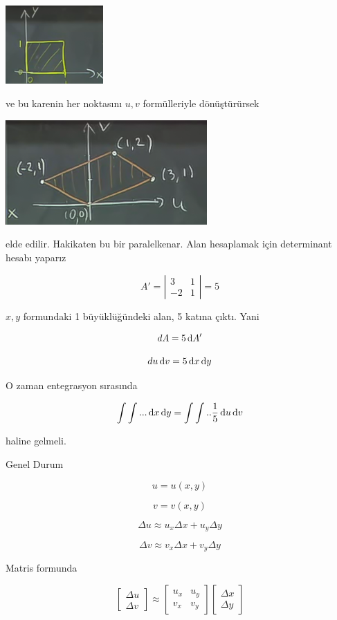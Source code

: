 \documentclass[12pt,fleqn]{article}\usepackage{../../common}
\begin{document}
\begin{center}
\includegraphics[height=3cm]{18_4.png}
\end{center}

ve bu karenin her noktasını $u,v$ formülleriyle dönüştürürsek

\begin{center}
\includegraphics[height=4cm]{18_5.png}
\end{center}

elde edilir. Hakikaten bu bir paralelkenar. Alan hesaplamak için
determinant hesabı yaparız

$$ A' = 
\left|\begin{array}{rr}
3 & 1 \\
-2 & 1
\end{array}\right| = 5
 $$

$x,y$ formundaki 1 büyüklüğündeki alan, 5 katına çıktı. Yani 

$$ dA = 5 \,\mathrm{d} A' $$

$$ du \,\mathrm{d} v = 5 \,\mathrm{d} x \,\mathrm{d} y $$

O zaman entegrasyon sırasında 

$$ \int \int ... \,\mathrm{d} x \,\mathrm{d} y = \int \int ..  \frac{1}{5} \,\mathrm{d} u \,\mathrm{d} v $$

haline gelmeli. 

Genel Durum 

$$ u = u(x,y) $$

$$ v = v(x,y)  $$

$$ \Delta u \approx u_x \Delta x + u_y \Delta y  $$

$$ \Delta v \approx v_x \Delta x + v_y \Delta y  $$

Matris formunda 

$$ 
\left[\begin{array}{r}
\Delta u \\
\Delta v 
\end{array}\right] \approx 
\left[\begin{array}{rr}
u_x & u_y \\
v_x & v_y
\end{array}\right] 
\left[\begin{array}{r}
\Delta x \\
\Delta y 
\end{array}\right] 
$$
\end{document}
